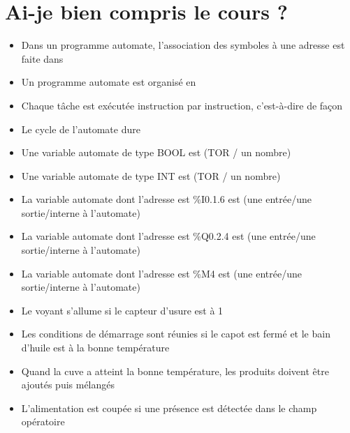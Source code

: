 \documentclass[11pt, multicol]{article}
\begin{document}
\UPSTIbuildPage


\section{Ai-je bien compris le cours ? }
\begin{itemize}
  \item Dans un programme automate, l’association des symboles à une adresse est faite dans 
  \item Un programme automate est organisé en 

  \item Chaque tâche est exécutée instruction par instruction, c’est-à-dire de façon 

  \item Le cycle de l’automate dure 

\end{itemize}

\begin{itemize}
  \item Une variable automate de type BOOL est (TOR / un nombre)
  \item Une variable automate de type INT est (TOR / un nombre)
  \item La variable automate dont l’adresse est \%I0.1.6 est (une entrée/une sortie/interne à l’automate)
  \item La variable automate dont l’adresse est \%Q0.2.4 est (une entrée/une sortie/interne à l’automate)
  \item La variable automate dont l’adresse est \%M4 est (une entrée/une sortie/interne à l’automate)
\end{itemize}


  \begin{itemize}
  \item Le voyant s’allume si le capteur d’usure est à 1
  \item Les conditions de démarrage sont réunies si le capot est fermé et le bain d’huile est à la bonne température
  \item Quand la cuve a atteint la bonne température, les produits doivent être ajoutés puis mélangés
  \item L’alimentation est coupée si une présence est détectée dans le champ opératoire
  \end{itemize}
\end{document}
